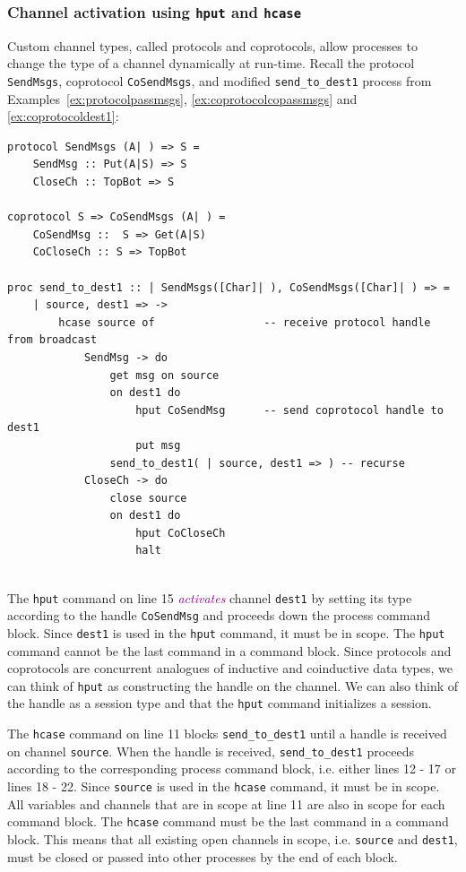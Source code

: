 \documentclass[acmsmall]{acmart}
\newcommand{\tc}[1]{\textcolor{darkMagenta}{\textit{#1}}}
\begin{document}
\subsubsection{Channel activation using \lstinline$hput$ and \lstinline$hcase$}
\label{subsec:hput-hcase}

Custom channel types, called protocols and coprotocols, allow processes to change the type of a channel dynamically at run-time.
Recall the protocol \lstinline$SendMsgs$, coprotocol \lstinline$CoSendMsgs$, and modified \lstinline$send_to_dest1$ process from Examples~\ref{ex:protocolpassmsgs}, \ref{ex:coprotocolcopassmsgs} and \ref{ex:coprotocoldest1}:
\begin{lstlisting}
protocol SendMsgs (A| ) => S =		
    SendMsg :: Put(A|S) => S 				
    CloseCh :: TopBot => S 				

coprotocol S => CoSendMsgs (A| ) =
    CoSendMsg ::  S => Get(A|S)
    CoCloseCh :: S => TopBot

proc send_to_dest1 :: | SendMsgs([Char]| ), CoSendMsgs([Char]| ) => =
	| source, dest1 => -> 
		hcase source of					-- receive protocol handle from broadcast
			SendMsg -> do
				get msg on source 		
				on dest1 do
					hput CoSendMsg		-- send coprotocol handle to dest1
					put msg
				send_to_dest1( | source, dest1 => ) -- recurse
			CloseCh -> do
				close source
				on dest1 do
					hput CoCloseCh
					halt
				
 \end{lstlisting}
The \lstinline$hput$ command on line 15 \tc{activates} channel \lstinline$dest1$ by setting its type according to the handle \lstinline$CoSendMsg$ and proceeds down the process command block.
Since \lstinline$dest1$ is used in the \lstinline$hput$ command, it must be in scope. 
The \lstinline$hput$ command cannot be the last command in a command block. 
Since protocols and coprotocols are concurrent analogues of inductive and coinductive data types, we can think of \lstinline$hput$ as constructing the handle on the channel.
We can also think of the handle as a session type and that the \lstinline$hput$ command initializes a session.

The \lstinline$hcase$ command on line 11 blocks \lstinline$send_to_dest1$ until a handle is received on channel \lstinline$source$.
When the handle is received, \lstinline$send_to_dest1$ proceeds according to the corresponding process command block, i.e. either lines 12 - 17 or lines 18 - 22.
Since \lstinline$source$ is used in the \lstinline$hcase$ command, it must be in scope. 
All variables and channels that are in scope at line 11 are also in scope for each command block.
The \lstinline$hcase$ command must be the last command in a command block. 
This means that all existing open channels in scope, i.e. \lstinline$source$ and \lstinline$dest1$, must be closed or passed into other processes by the end of each block.
\end{document}
